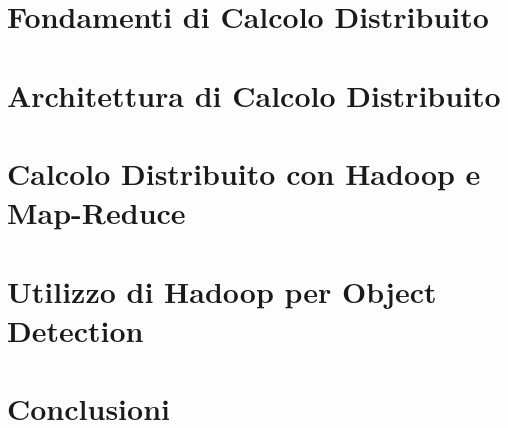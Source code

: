 \documentclass[12pt,a4paper,oneside]{report}
\begin{document}
  \chapter{Fondamenti di Calcolo Distribuito}
  
  \chapter{Architettura di Calcolo Distribuito}
  
  \chapter{Calcolo Distribuito con Hadoop e Map-Reduce}
  
  \chapter{Utilizzo di Hadoop per Object Detection }
  
  \chapter{Conclusioni}
  
  
\end{document}
